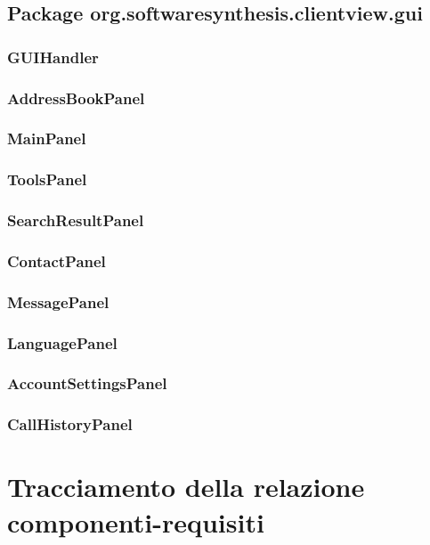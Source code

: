 \subsection{Package org.softwaresynthesis.clientview.gui}\label{sec:gui}

\subsubsection{GUIHandler}\label{sec:guihandler}

\subsubsection{AddressBookPanel}\label{sec:addressbookpanel}

\subsubsection{MainPanel}\label{sec:mainpanel}

\subsubsection{ToolsPanel}\label{sec:toolspanel}

\subsubsection{SearchResultPanel}\label{sec:searchresultpanel}

\subsubsection{ContactPanel}\label{sec:contactpanel}

\subsubsection{MessagePanel}\label{sec:messagepanel}

\subsubsection{LanguagePanel}\label{sec:languagepanel}

\subsubsection{AccountSettingsPanel}\label{sec:accountsettingspanel}

\subsubsection{CallHistoryPanel}\label{sec:callhistorypanel}

\clearpage

\section{Tracciamento della relazione componenti-requisiti}


